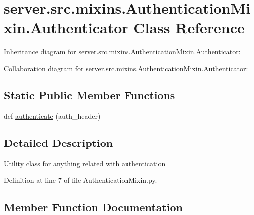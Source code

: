 \hypertarget{classserver_1_1src_1_1mixins_1_1_authentication_mixin_1_1_authenticator}{}\section{server.\+src.\+mixins.\+Authentication\+Mixin.\+Authenticator Class Reference}
\label{classserver_1_1src_1_1mixins_1_1_authentication_mixin_1_1_authenticator}


Inheritance diagram for server.\+src.\+mixins.\+Authentication\+Mixin.\+Authenticator\+:


Collaboration diagram for server.\+src.\+mixins.\+Authentication\+Mixin.\+Authenticator\+:
\subsection*{Static Public Member Functions}
\begin{DoxyCompactItemize}
\item 
def \hyperlink{classserver_1_1src_1_1mixins_1_1_authentication_mixin_1_1_authenticator_a458b909de86376c39b218864b12f8543}{authenticate} (auth\+\_\+header)
\end{DoxyCompactItemize}


\subsection{Detailed Description}
\begin{DoxyVerb}Utility class for anything related with authentication\end{DoxyVerb}
 

Definition at line 7 of file Authentication\+Mixin.\+py.



\subsection{Member Function Documentation}
